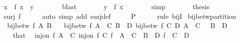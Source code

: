 \begin{isabellebody}
\ x\ \ {\isacartoucheopen}f\ x\ {\isacharequal}{\kern0pt}\ y{\isacartoucheclose}\isanewline
\ \ \ \ \ \ \isamarkupfalse%
\ blast\isanewline
\ \ \ \ \isamarkupfalse%
\ \isamarkupfalse%
\ {\isacartoucheopen}y\ {\isacharequal}{\kern0pt}\ f\ x{\isacartoucheclose}\isanewline
\ \ \ \ \ \ \isamarkupfalse%
\ simp\isanewline
\ \ \ \ \isamarkupfalse%
\ \isamarkupfalse%
\ {\isacharquery}{\kern0pt}thesis\ \isacommand{{\isachardot}{\kern0pt}{\isachardot}{\kern0pt}}\isamarkupfalse%
\isanewline
\ \ \isamarkupfalse%
\isanewline
\ \ \isamarkupfalse%
\ \isamarkupfalse%
\ {\isacartoucheopen}surj\ f{\isacartoucheclose}\isanewline
\ \ \ \ \isamarkupfalse%
\ {\isacharparenleft}{\kern0pt}auto\ simp\ add{\isacharcolon}{\kern0pt}\ surj{\isacharunderscore}{\kern0pt}def{\isacharparenright}{\kern0pt}\isanewline
\ \ \isamarkupfalse%
\ \isamarkupfalse%
\ {\isacharquery}{\kern0pt}P\isanewline
\ \ \ \ \isamarkupfalse%
\ {\isacharparenleft}{\kern0pt}rule\ bijI{\isacharparenright}{\kern0pt}\isanewline
{}\isamarkupfalse%
%
\endisatagproof
{\isafoldproof}%
%
\isadelimproof
\isanewline
%
\endisadelimproof
\isanewline
{}\isamarkupfalse%
\ bij{\isacharunderscore}{\kern0pt}betw{\isacharunderscore}{\kern0pt}partition{\isacharcolon}{\kern0pt}\isanewline
\ \ {\isacartoucheopen}bij{\isacharunderscore}{\kern0pt}betw\ f\ A\ B{\isacartoucheclose}\isanewline
\ \ \ {\isacartoucheopen}bij{\isacharunderscore}{\kern0pt}betw\ f\ {\isacharparenleft}{\kern0pt}A\ {\isasymunion}\ C{\isacharparenright}{\kern0pt}\ {\isacharparenleft}{\kern0pt}B\ {\isasymunion}\ D{\isacharparenright}{\kern0pt}{\isacartoucheclose}\ {\isacartoucheopen}bij{\isacharunderscore}{\kern0pt}betw\ f\ C\ D{\isacartoucheclose}\ {\isacartoucheopen}A\ {\isasyminter}\ C\ {\isacharequal}{\kern0pt}\ {\isacharbraceleft}{\kern0pt}{\isacharbraceright}{\kern0pt}{\isacartoucheclose}\ {\isacartoucheopen}B\ {\isasyminter}\ D\ {\isacharequal}{\kern0pt}\ {\isacharbraceleft}{\kern0pt}{\isacharbraceright}{\kern0pt}{\isacartoucheclose}\isanewline
%
\isadelimproof
%
\endisadelimproof
%
\isatagproof
{}\isamarkupfalse%
\ {\isacharminus}{\kern0pt}\isanewline
\ \ \isamarkupfalse%
\ that\ \isamarkupfalse%
\ {\isacartoucheopen}inj{\isacharunderscore}{\kern0pt}on\ f\ {\isacharparenleft}{\kern0pt}A\ {\isasymunion}\ C{\isacharparenright}{\kern0pt}{\isacartoucheclose}\ {\isacartoucheopen}inj{\isacharunderscore}{\kern0pt}on\ f\ C{\isacartoucheclose}\ {\isacartoucheopen}f\ {\isacharbackquote}{\kern0pt}\ {\isacharparenleft}{\kern0pt}A\ {\isasymunion}\ C{\isacharparenright}{\kern0pt}\ {\isacharequal}{\kern0pt}\ B\ {\isasymunion}\ D{\isacartoucheclose}\ {\isacartoucheopen}f\ {\isacharbackquote}{\kern0pt}\ C\ {\isacharequal}{\kern0pt}\ D{\isacartoucheclose}\isanewline

\end{isabellebody}
